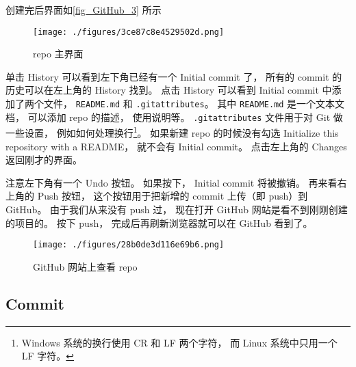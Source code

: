 创建完后界面如\autoref{fig_GitHub_3} 所示
\begin{figure}[ht]
\centering
\texttt{[image: ./figures/3ce87c8e4529502d.png]}
\caption{repo 主界面} \label{fig_GitHub_3}
\end{figure}

单击 History 可以看到左下角已经有一个 Initial commit 了， 所有的 commit 的历史可以在左上角的 History 找到。 点击 History 可以看到 Initial commit 中添加了两个文件， \verb|README.md| 和 \verb|.gitattributes|。 其中 \verb|README.md| 是一个文本文档， 可以添加 repo 的描述， 使用说明等。 \verb|.gitattributes| 文件用于对 Git 做一些设置， 例如如何处理换行\footnote{Windows 系统的换行使用 CR 和 LF 两个字符， 而 Linux 系统中只用一个 LF 字符。}。 如果新建 repo 的时候没有勾选 Initialize this repository with a README， 就不会有 Initial commit。 点击左上角的 Changes 返回刚才的界面。

注意左下角有一个 Undo 按钮。 如果按下， Initial commit 将被撤销。 再来看右上角的 Push 按钮， 这个按钮用于把新增的 commit 上传（即 push）到 GitHub。 由于我们从来没有 push 过， 现在打开 GitHub 网站是看不到刚刚创建的项目的。 按下 push， 完成后再刷新浏览器就可以在 GitHub 看到了。
\begin{figure}[ht]
\centering
\texttt{[image: ./figures/28b0de3d116e69b6.png]}
\caption{GitHub 网站上查看 repo} \label{fig_GitHub_5}
\end{figure}

\subsection{Commit}
